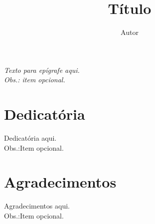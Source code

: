 \documentclass[12pt,times,a4paper,twoside]{icmc}
\begin{document}
\onehalfspacing

\title{Título}

\author{Autor}

\begingroup
% 

\frontmatter \pagestyle{plain}


\begin{titlepage}
\vspace*{20cm}
\begin{flushright}
\begin{minipage}[t]{7.0 cm}
\textit{Texto para epígrafe aqui.\\Obs.: item opcional.}
\end{minipage}
\end{flushright}
\end{titlepage}

\chapter*{Dedicatória}
\begin{flushright}
    Dedicatória aqui.\\
    Obs.:Item opcional.
\end{flushright}

\chapter*{Agradecimentos}

Agradecimentos aqui.\\
Obs.:Item opcional.



\tableofcontents

\listoffigures
\listoftables



\cleardoublepage{\pagestyle{plain}\clearpage}

\endgroup

\mainmatter

\renewcommand{\chaptermark}[1]{%

\markboth{\chaptername
\ \thechapter.\ #1}{}}  %
\end{document}
